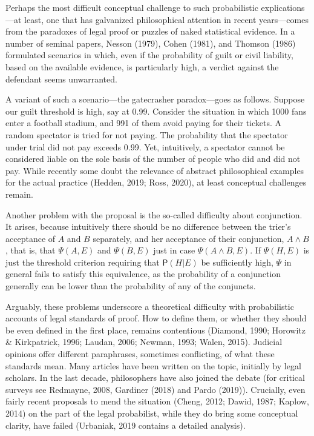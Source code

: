 \documentclass[11pt,dvipsnames,enabledeprecatedfontcommands]{scrartcl}
\newcommand{\pr}[1]{\mathsf{P}(#1)}
\begin{document}
Perhaps the most difficult conceptual challenge to such probabilistic
explications---at least, one that has galvanized philosophical attention
in recent years---comes from the paradoxes of legal proof or puzzles of
naked statistical evidence. In a number of seminal papers, Nesson
(1979), Cohen (1981), and Thomson (1986) formulated scenarios in which,
even if the probability of guilt or civil liability, based on the
available evidence, is particularly high, a verdict against the
defendant seems unwarranted.

A variant of such a scenario---the gatecrasher paradox---goes as
follows. Suppose our guilt threshold is high, say at 0.99. Consider the
situation in which 1000 fans enter a football stadium, and 991 of them
avoid paying for their tickets. A random spectator is tried for not
paying. The probability that the spectator under trial did not pay
exceeds 0.99. Yet, intuitively, a spectator cannot be considered liable
on the sole basis of the number of people who did and did not pay. While
recently some doubt the relevance of abstract philosophical examples for
the actual practice (Hedden, 2019; Ross, 2020), at least conceptual
challenges remain.

Another problem with the proposal is the so-called difficulty about
conjunction. It arises, because intuitively there should be no
difference between the trier's acceptance of \(A\) and \(B\) separately,
and her acceptance of their conjunction, \(A\wedge B\) , that is, that
\(\Psi(A,E)\) and \(\Psi(B,E)\) just in case \(\Psi(A\wedge B, E)\). If
\(\Psi(H,E)\) is just the threshold criterion requiring that
\(\pr{H\vert E}\) be sufficiently high, \(\Psi\) in general fails to
satisfy this equivalence, as the probability of a conjunction generally
can be lower than the probability of any of the conjuncts.

Arguably, these problems underscore a theoretical difficulty with
probabilistic accounts of legal standards of proof. How to define them,
or whether they should be even defined in the first place, remains
contentious (Diamond, 1990; Horowitz \& Kirkpatrick, 1996; Laudan, 2006;
Newman, 1993; Walen, 2015). Judicial opinions offer different
paraphrases, sometimes conflicting, of what these standards mean. Many
articles have been written on the topic, initially by legal scholars. In
the last decade, philosophers have also joined the debate (for critical
surveys see Redmayne, 2008, Gardiner (2018) and Pardo (2019)).
Crucially, even fairly recent proposals to mend the situation (Cheng,
2012; Dawid, 1987; Kaplow, 2014) on the part of the legal probabilist,
while they do bring some conceptual clarity, have failed (Urbaniak, 2019
contains a detailed analysis).
\end{document}
